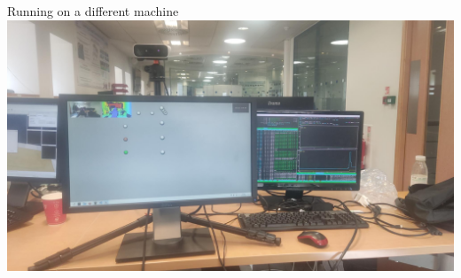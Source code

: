 \begin{figureBox}[label={fig:other-machine}, width=0.7\linewidth]{Running on a different machine}
	\includegraphics[width = 1.0\linewidth]{./evaluation/figures/other-device.jpeg}
\end{figureBox}